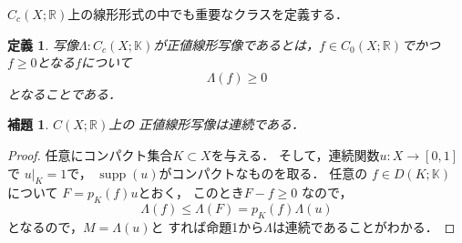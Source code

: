 \documentclass[leqno]{jsarticle}
\newtheorem{lem}[thm]{補題}
\newtheorem{df}[thm]{定義}
\newcommand{\rr}{\mathbb{R}}
\DeclareMathOperator{\supp}{supp}
\begin{document}
$C_c(X; \rr)$上の線形形式の中でも重要なクラスを定義する．
\begin{df}
写像$\Lambda: C_c(X; \mathbb{K})$が正値線形写像であるとは，$f\in C_0(X; \rr)$でかつ$f\ge 0$となる$f$について
\[
\Lambda(f)\ge 0
\]
となることである．
\end{df}

\begin{lem}
$C(X; \rr)$上の
正値線形写像は連続である．
\end{lem}
\begin{proof}
任意にコンパクト集合$K\subset X$を与える．
そして，連続関数$u: X\to [0, 1]$で
$u|_K=1$で，
$\supp(u)$がコンパクトなものを取る．
任意の
$f\in D(K; \mathbb{K})$
について
$F=p_K(f)u$とおく，
このとき$F-f\ge 0$
なので，
\[
\Lambda(f)\le \Lambda(F)=p_K(f)\Lambda(u)
\]
となるので，$M=\Lambda(u)$と
すれば命題1から$\Lambda$は連続であることがわかる．
\end{proof}
\end{document}
